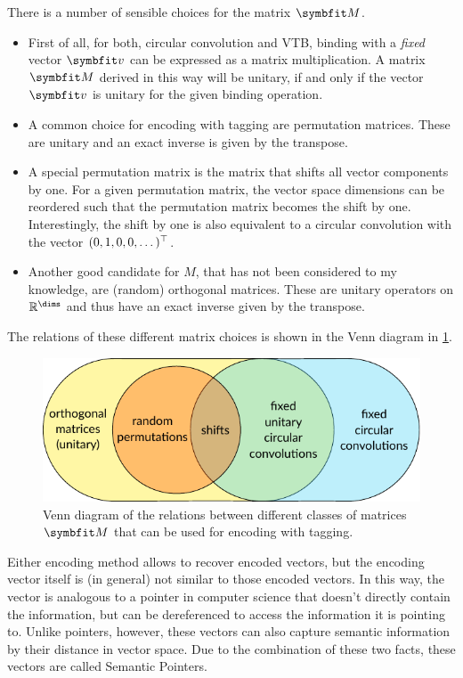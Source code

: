 There is a number of sensible choices for the matrix $\mat M$.
\begin{itemize}
    \item First of all, for both, circular convolution and VTB, binding with a \emph{fixed} vector $\vc v$ can be expressed as a matrix multiplication.
        A matrix $\mat M$ derived in this way will be unitary, if and only if the vector $\vc v$ is unitary for the given binding operation.
    \item A common choice for encoding with tagging are permutation matrices.
        These are unitary and an exact inverse is given by the transpose.
    \item A special permutation matrix is the matrix that shifts all vector components by one.
        For a given permutation matrix, the vector space dimensions can be reordered such that the permutation matrix becomes the shift by one.
        Interestingly, the shift by one is also equivalent to a circular convolution with the vector $(0, 1, 0, 0, \dotsc)^{\top}$.
    \item Another good candidate for $M$, that has not been considered to my knowledge, are (random) orthogonal matrices.
        These are unitary operators on $\mathbb{R}^{\dims}$ and thus have an exact inverse given by the transpose.
\end{itemize}
The relations of these different matrix choices is shown in the Venn diagram in \cref{fig:tagging-matrices}.
\begin{figure}
    \centering
    \includegraphics{figures/tagging-matrices}
    \caption[Venn diagram of matrices for encoding with tagging]{Venn diagram of the relations between different classes of matrices $\mat M$ that can be used for encoding with tagging.}\label{fig:tagging-matrices}
\end{figure}

Either encoding method allows to recover encoded vectors, but the encoding vector itself is (in general) not similar to those encoded vectors.
In this way, the vector is analogous to a pointer in computer science that doesn't directly contain the information, but can be dereferenced to access the information it is pointing to.
Unlike pointers, however, these vectors can also capture semantic information by their distance in vector space.
Due to the combination of these two facts, these vectors are called Semantic Pointers. 


